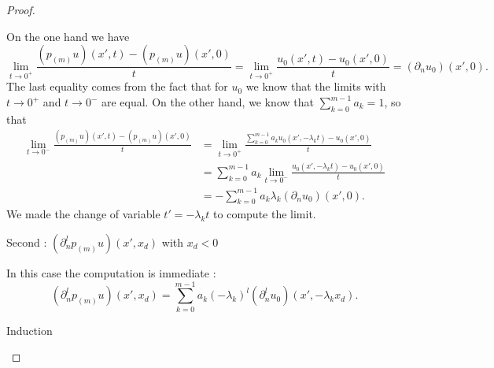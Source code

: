 \begin{proof}
\begin{subproof}
            On the one hand we have
            \begin{equation}
                \lim_{t\to 0^+} \frac{ (p_{(m)}u)(x',t)-(p_(m)u)(x',0) }{ t }=\lim_{t\to 0^+} \frac{ u_0(x',t)-u_0(x',0) }{ t }=(\partial_nu_0)(x',0).
            \end{equation}
            The last equality comes from the fact that for \( u_0\) we know that the limits with \( t\to 0^+\) and \( t\to 0^-\) are equal. On the other hand, we know that \( \sum_{k=0}^{m-1}a_k=1\), so that
            \begin{subequations}
                \begin{align}
                    \lim_{t\to 0^-} \frac{ (p_{(m)}u)(x',t)-(p_(m)u)(x',0) }{ t }&=\lim_{t\to 0^+} \frac{ \sum_{k=0}^{m-1}a_ku_0(x',-\lambda_kt)-u_0(x',0) }{ t }\\
                    &=\sum_{k=0}^{m-1}a_k\lim_{t\to 0^-} \frac{ u_0(x',-\lambda_kt)-u_0(x',0) }{ t }\\
                    &=-\sum_{k=0}^{m-1}a_k\lambda_k(\partial_n u_0)(x',0).
                \end{align}
            \end{subequations}
            We made the change of variable \( t'=-\lambda_kt\) to compute the limit.

        \item[Second : \( (\partial_n^lp_{(m)}u)(x',x_d)\) with \( x_d<0\)]

            In this case the computation is immediate :
            \begin{equation}
                (\partial_n^lp_{(m)}u)(x',x_d)=\sum_{k=0}^{m-1}a_k(-\lambda_k)^l(\partial_n^lu_0)(x',-\lambda_kx_d).
            \end{equation}
            
        \item[Induction]


\end{subproof}
\end{proof}
